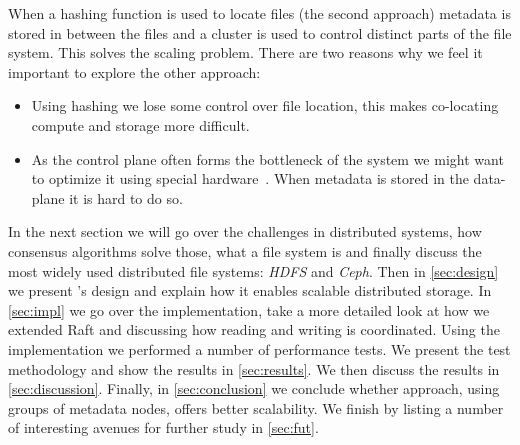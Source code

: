 When a hashing function is used to locate files (the second approach) metadata is stored in between the files and a cluster is used to control distinct parts of the file system. This solves the scaling problem. There are two reasons why we feel it important to explore the other approach:
\begin{itemize}
	\item Using hashing we lose some control over file location, this makes co-locating compute and storage more difficult.
	\item As the control plane often forms the bottleneck of the system we might want to optimize it using special hardware~\cite{polarfs}. When metadata is stored in the data-plane it is hard to do so.
\end{itemize}

In the next section we will go over the challenges in distributed systems, how consensus algorithms solve those, what a file system is and finally discuss the most widely used distributed file systems: \textit{HDFS} and \textit{Ceph}. 
%
Then in \cref{sec:design} we present \name{}'s design and explain how it enables scalable distributed storage.
%
In \cref{sec:impl} we go over the implementation, take a more detailed look at how we extended Raft and discussing how reading and writing is coordinated.
%
Using the \name{} implementation we performed a number of performance tests. We present the test methodology and show the results in \cref{sec:results}.
% 
We then discuss the results in \cref{sec:discussion}.
%
Finally, in \cref{sec:conclusion} we conclude whether \name{} approach, using groups of metadata nodes, offers better scalability. 
%
We finish by listing a number of interesting avenues for further study in \cref{sec:fut}.
